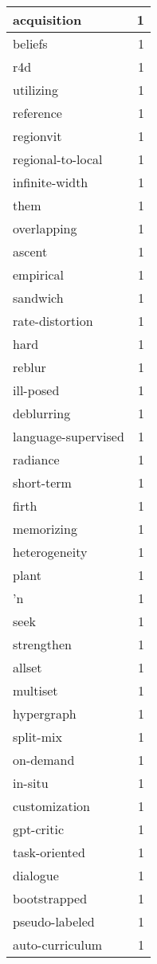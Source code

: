 \begin{table}[h]
\begin{tabular}{|l|r|}
\hline
acquisition & 1 \\
\hline
beliefs & 1 \\
\hline
r4d & 1 \\
\hline
utilizing & 1 \\
\hline
reference & 1 \\
\hline
regionvit & 1 \\
\hline
regional-to-local & 1 \\
\hline
infinite-width & 1 \\
\hline
them & 1 \\
\hline
overlapping & 1 \\
\hline
ascent & 1 \\
\hline
empirical & 1 \\
\hline
sandwich & 1 \\
\hline
rate-distortion & 1 \\
\hline
hard & 1 \\
\hline
reblur & 1 \\
\hline
ill-posed & 1 \\
\hline
deblurring & 1 \\
\hline
language-supervised & 1 \\
\hline
radiance & 1 \\
\hline
short-term & 1 \\
\hline
firth & 1 \\
\hline
memorizing & 1 \\
\hline
heterogeneity & 1 \\
\hline
plant & 1 \\
\hline
'n & 1 \\
\hline
seek & 1 \\
\hline
strengthen & 1 \\
\hline
allset & 1 \\
\hline
multiset & 1 \\
\hline
hypergraph & 1 \\
\hline
split-mix & 1 \\
\hline
on-demand & 1 \\
\hline
in-situ & 1 \\
\hline
customization & 1 \\
\hline
gpt-critic & 1 \\
\hline
task-oriented & 1 \\
\hline
dialogue & 1 \\
\hline
bootstrapped & 1 \\
\hline
pseudo-labeled & 1 \\
\hline
auto-curriculum & 1 \\

\end{tabular}
\end{table}
